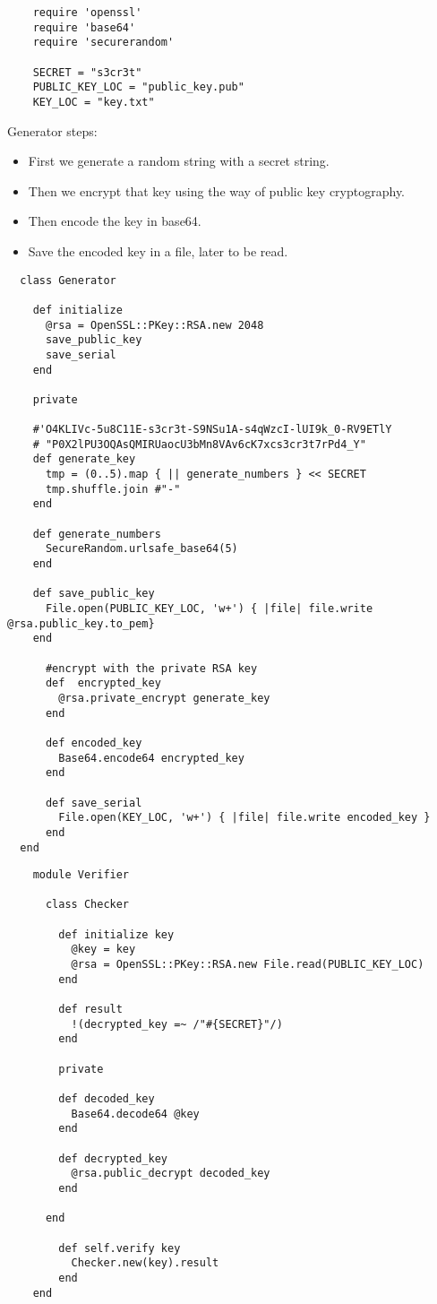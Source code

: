 \documentclass{article}
\begin{document}
  \begin{lstlisting}
    require 'openssl'
    require 'base64'
    require 'securerandom'

    SECRET = "s3cr3t"
    PUBLIC_KEY_LOC = "public_key.pub"
    KEY_LOC = "key.txt"
  \end{lstlisting}

  Generator steps:

  \begin{itemize}
    \item First we generate a random string with a secret string.
    \item Then we encrypt that key using the way of public key cryptography.
    \item Then encode the key in base64.
    \item Save the encoded key in a file, later to be read.
  \end{itemize}

  \begin{lstlisting}
  class Generator

    def initialize
      @rsa = OpenSSL::PKey::RSA.new 2048
      save_public_key
      save_serial
    end

    private

    #'O4KLIVc-5u8C11E-s3cr3t-S9NSu1A-s4qWzcI-lUI9k_0-RV9ETlY
    # "P0X2lPU3OQAsQMIRUaocU3bMn8VAv6cK7xcs3cr3t7rPd4_Y"
    def generate_key
      tmp = (0..5).map { || generate_numbers } << SECRET 
      tmp.shuffle.join #"-"
    end

    def generate_numbers
      SecureRandom.urlsafe_base64(5)
    end

    def save_public_key
      File.open(PUBLIC_KEY_LOC, 'w+') { |file| file.write @rsa.public_key.to_pem}
    end

      #encrypt with the private RSA key
      def  encrypted_key
        @rsa.private_encrypt generate_key
      end

      def encoded_key
        Base64.encode64 encrypted_key
      end

      def save_serial
        File.open(KEY_LOC, 'w+') { |file| file.write encoded_key }
      end
  end
  \end{lstlisting}

   \begin{lstlisting}
    module Verifier

      class Checker

        def initialize key
          @key = key
          @rsa = OpenSSL::PKey::RSA.new File.read(PUBLIC_KEY_LOC)
        end

        def result
          !(decrypted_key =~ /"#{SECRET}"/)
        end

        private

        def decoded_key
          Base64.decode64 @key
        end

        def decrypted_key 
          @rsa.public_decrypt decoded_key
        end

      end

        def self.verify key
          Checker.new(key).result
        end
    end

    \end{lstlisting}
\end{document}
